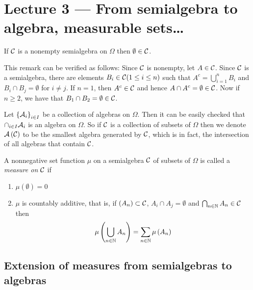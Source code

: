 \section{Lecture 3 --- From semialgebra to algebra, measurable sets\ldots }

\begin{remark}
    If ${\cal C}$ is a nonempty semialgebra on $\Omega$ then $\emptyset \in {\cal C}$.

    This remark can be verified as follows: Since ${\cal C}$ is nonempty, let $A\in{\cal C}$. Since ${\cal C}$ is a semialgebra, there are elements $B_i \in {\cal C} (1\le i \le n)$ such that $A^c = \bigcup_{i=1}^{n} B_i$ and $B_i \cap B_j = \emptyset$ for $i\ne j$. If $n=1$, then $A^c \in {\cal C}$ and hence $A\cap A^c = \emptyset \in {\cal C}$. Now if $n\ge 2$, we have that $B_1 \cap B_2 = \emptyset \in {\cal C}$.
    \label{rem:empty-in-semialgebra}
\end{remark}

\begin{remark}
    Let $\left\{ {\cal A} _i \right\}_{i \in I}$ be a collection of algebras on $\Omega$. Then it can be easily checked that $\cap_{i\in I} {\cal A} _i$ is an algebra on $\Omega$. So if ${\cal C}$ is a collection of subsets of $\Omega$ then we denote ${\cal A} \left( {\cal C} \right)$ to be the smallest algebra generated by ${\cal C}$, which is in fact, the intersection of all algebras that contain ${\cal C}$.
    \label{rem:smallest-algebra}
\end{remark}

\begin{definition}
    A nonnegative set function $\mu$ on a semialgebra ${\cal C}$ of subsets of $\Omega$ is called a \textit{measure on ${\cal C}$} if
    \begin{enumerate}[label= (\roman*)]
	\item $\mu (\emptyset ) = 0$
	\item $\mu$ is countably additive, that is, if $\left( A_n \right) \subset {\cal C}$, $A_i \cap A_j = \emptyset$ and $\bigcap_{n\in \mathbb N} A_n \in {\cal C}$ then 
	    \begin{equation*}
		\mu \left( \bigcup_{n\in \mathbb N} A_n \right) = \sum_{n\in \mathbb N} \mu \left( A_n \right)
		    \end{equation*}

    \end{enumerate}
    \label{def:measure-on-semialgebra}
\end{definition}

\subsection{Extension of measures from semialgebras to algebras}

